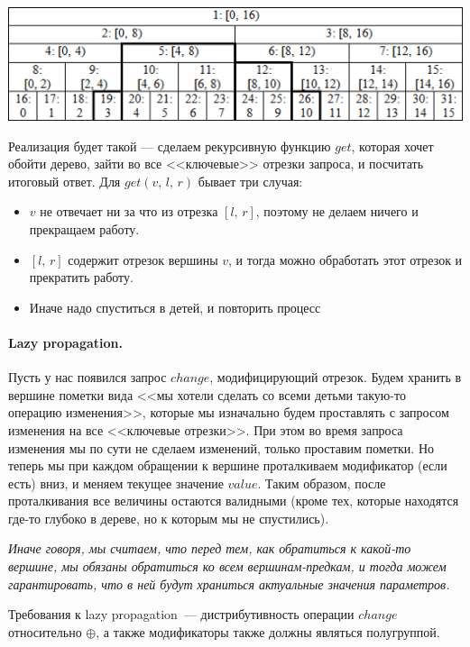 \documentclass[12pt]{article}
\begin{document}
\includegraphics{pictures/segtree.png}

Реализация будет такой --- сделаем рекурсивную функцию $get$, которая хочет обойти дерево, зайти во все <<ключевые>> отрезки запроса, и посчитать итоговый ответ. Для $get(v,\,l,\,r)$ бывает три случая:
\begin{itemize}
\item $v$ не отвечает ни за что из отрезка $[l,\,r]$, поэтому не делаем ничего и прекращаем работу.
\item $[l,\,r]$ содержит отрезок вершины $v$, и тогда можно обработать этот отрезок и прекратить работу.
\item Иначе надо спуститься в детей, и повторить процесс
\end{itemize}

\paragraph{Lazy propagation.} Пусть у нас появился запрос $change$, модифицирующий отрезок. Будем хранить в вершине пометки вида <<мы хотели сделать со всеми детьми такую-то операцию изменения>>, которые мы изначально будем проставлять с запросом изменения на все <<ключевые отрезки>>. При этом во время запроса изменения мы по сути не сделаем изменений, только проставим пометки. Но теперь мы при каждом обращении к вершине проталкиваем модификатор (если есть) вниз, и меняем текущее значение $value$. Таким образом, после проталкивания все величины остаются валидными (кроме тех, которые находятся где-то глубоко в дереве, но к которым мы не спустились). 

\textit{Иначе говоря, мы считаем, что перед тем, как обратиться к какой-то вершине, мы обязаны обратиться ко всем вершинам-предкам, и тогда можем гарантировать, что в ней будут храниться актуальные значения параметров.}

Требования к lazy propagation~--- дистрибутивность операции $change$ относительно $\oplus$, а также модификаторы также должны являться полугруппой.
\end{document}
